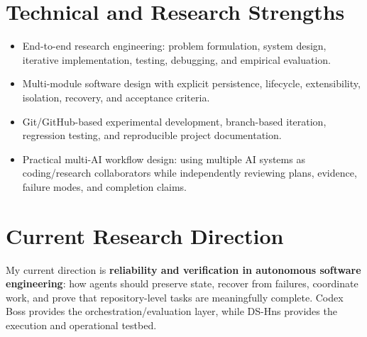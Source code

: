\documentclass[10pt,a4paper]{article}
\begin{document}
\section{Technical and Research Strengths}
\begin{itemize}
  \item End-to-end research engineering: problem formulation, system design, iterative implementation, testing, debugging, and empirical evaluation.
  \item Multi-module software design with explicit persistence, lifecycle, extensibility, isolation, recovery, and acceptance criteria.
  \item Git/GitHub-based experimental development, branch-based iteration, regression testing, and reproducible project documentation.
  \item Practical multi-AI workflow design: using multiple AI systems as coding/research collaborators while independently reviewing plans, evidence, failure modes, and completion claims.
\end{itemize}

\section{Current Research Direction}
My current direction is \textbf{reliability and verification in autonomous software engineering}: how agents should preserve state, recover from failures, coordinate work, and prove that repository-level tasks are meaningfully complete. Codex Boss provides the orchestration/evaluation layer, while DS-Hns provides the execution and operational testbed.
\end{document}

